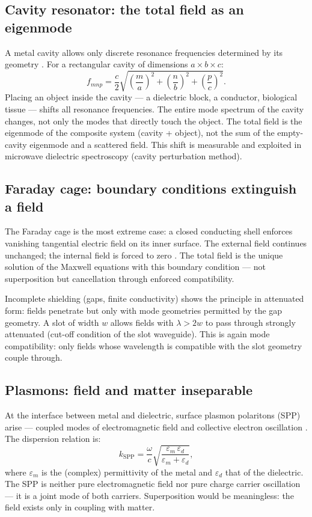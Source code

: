 \subsection*{Cavity resonator: the total field as an eigenmode}

A metal cavity allows only discrete resonance frequencies determined by
its geometry \cite{Pozar2012,Griffiths1999}. For a rectangular cavity
of dimensions $a \times b \times c$:
\[
  f_{mnp} = \frac{c}{2}\sqrt{\left(\frac{m}{a}\right)^2
    + \left(\frac{n}{b}\right)^2 + \left(\frac{p}{c}\right)^2}.
\]
Placing an object inside the cavity --- a dielectric block, a conductor,
biological tissue --- shifts all resonance frequencies. The entire mode
spectrum of the cavity changes, not only the modes that directly touch the
object. The total field is the eigenmode of the composite system (cavity
+ object), not the sum of the empty-cavity eigenmode and a scattered field.
This shift is measurable and exploited in microwave dielectric spectroscopy
(cavity perturbation method).

\subsection*{Faraday cage: boundary conditions extinguish a field}

The Faraday cage is the most extreme case: a closed conducting shell
enforces vanishing tangential electric field on its inner surface. The
external field continues unchanged; the internal field is forced to zero
\EM. The total field is the unique solution of the Maxwell equations with
this boundary condition --- not superposition but cancellation through
enforced compatibility.

Incomplete shielding (gaps, finite conductivity) shows the principle in
attenuated form: fields penetrate but only with mode geometries permitted
by the gap geometry. A slot of width $w$ allows fields with $\lambda > 2w$
to pass through strongly attenuated (cut-off condition of the slot
waveguide). This is again mode compatibility: only fields whose wavelength
is compatible with the slot geometry couple through.

\subsection*{Plasmons: field and matter inseparable}

At the interface between metal and dielectric, surface plasmon polaritons
(SPP) arise --- coupled modes of electromagnetic field and collective
electron oscillation \cite{Maier2007}. The dispersion relation is:
\[
  k_\mathrm{SPP} = \frac{\omega}{c}\sqrt{\frac{\varepsilon_m\,\varepsilon_d}
    {\varepsilon_m + \varepsilon_d}},
\]
where $\varepsilon_m$ is the (complex) permittivity of the metal and
$\varepsilon_d$ that of the dielectric. The SPP is neither pure
electromagnetic field nor pure charge carrier oscillation --- it is a
joint mode of both carriers. Superposition would be meaningless: the
field exists only in coupling with matter.

